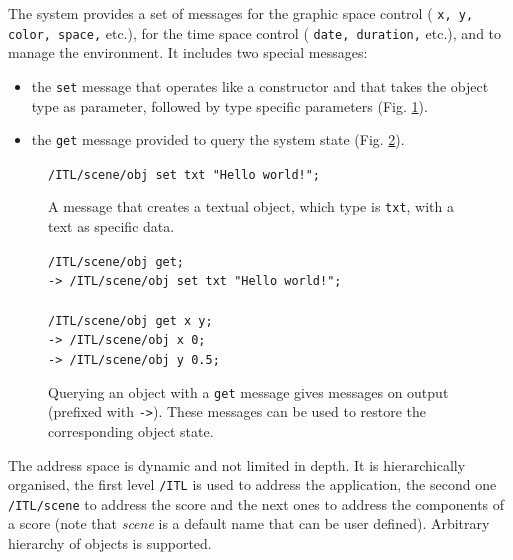 \documentclass[11pt,a4paper]{article}
\newcommand{\OSC}[1]	{{\fontsize{10pt}{10pt} \selectfont\texttt{#1}}}
\newcommand{\tab}		{\hspace*{4mm}}
\newcommand{\sample}[1]	{\vspace{-0.2em}\begin{center}\colorbox{mygrey}{\begin{minipage}[t]{0.98\columnwidth} {\small \texttt{#1}}\end{minipage}}\end{center}}
\begin{document}
The system provides a set of messages for the graphic space control (\OSC{x, y, color, space,} etc.), for the time space control (\OSC{date, duration,} etc.), and to manage the environment. It includes two special messages:
\begin{itemize}
\item the \OSC{set} message that operates like a constructor and that takes the object type as parameter, followed by type specific parameters (Fig. \ref{fig:set}).
\item the \OSC{get} message provided to query the system state  (Fig. \ref{fig:get}).
\end{itemize}

\begin{figure}[ht]
\begin{center}
\sample{/ITL/scene/obj set txt "Hello world!";
}
\caption{A message that creates a textual object, which type is \OSC{txt}, with a text as specific data.}
\label{fig:set}
\end{center}
\end{figure}

\begin{figure}[ht]
\begin{center}
\sample{/ITL/scene/obj get;\\
\tab -> /ITL/scene/obj set txt "Hello world!";\\
\\
/ITL/scene/obj get x y;\\
\tab -> /ITL/scene/obj x 0;\\
\tab -> /ITL/scene/obj y 0.5;
}
\caption{Querying an object with a \OSC{get} message gives messages on output (prefixed with \OSC{->}). These messages can be used to restore the corresponding object state.}
\label{fig:get}
\end{center}
\end{figure}

The address space is dynamic and not limited in depth. It is hierarchically organised, the first level \OSC{/ITL} is used to address the application, the second one 
\OSC{/ITL/scene} 
to address the score and the next ones to address the components of a score (note that \textit{scene} is a default name that can be user defined). Arbitrary hierarchy of objects is supported.

\end{document}
